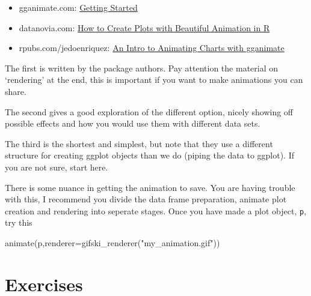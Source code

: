 \documentclass[
]{book}
\newenvironment{Shaded}{\begin{snugshade}}{\end{snugshade}}
\newcommand{\AttributeTok}[1]{\textcolor[rgb]{0.77,0.63,0.00}{#1}}
\newcommand{\FunctionTok}[1]{\textcolor[rgb]{0.00,0.00,0.00}{#1}}
\newcommand{\NormalTok}[1]{#1}
\newcommand{\StringTok}[1]{\textcolor[rgb]{0.31,0.60,0.02}{#1}}
\providecommand{\tightlist}{%
  \setlength{\itemsep}{0pt}\setlength{\parskip}{0pt}}
\begin{document}
\begin{itemize}
\tightlist
\item
  gganimate.com: \href{https://gganimate.com/articles/gganimate.html}{Getting Started}
\item
  datanovia.com: \href{https://www.datanovia.com/en/blog/gganimate-how-to-create-plots-with-beautiful-animation-in-r}{How to Create Plots with Beautiful Animation in R}
\item
  rpubs.com/jedoenriquez: \href{https://rpubs.com/jedoenriquez/animatingchartsintro}{An Intro to Animating Charts with gganimate}
\end{itemize}

The first is written by the package authors. Pay attention the material on `rendering' at the end, this is important if you want to make animations you can share.

The second gives a good exploration of the different option, nicely showing off possible effects and how you would use them with different data sets.

The third is the shortest and simplest, but note that they use a different structure for creating ggplot objects than we do (piping the data to ggplot). If you are not sure, start here.

There is some nuance in getting the animation to save. You are having trouble with this, I recommend you divide the data frame preparation, animate plot creation and rendering into seperate stages. Once you have made a plot object, \texttt{p}, try this

\begin{Shaded}
\begin{Highlighting}[]
\FunctionTok{animate}\NormalTok{(p,}\AttributeTok{renderer=}\FunctionTok{gifski\_renderer}\NormalTok{(}\StringTok{"my\_animation.gif"}\NormalTok{))}
\end{Highlighting}
\end{Shaded}

\hypertarget{exercises-6}{%
\section{Exercises}\label{exercises-6}}
\end{document}
